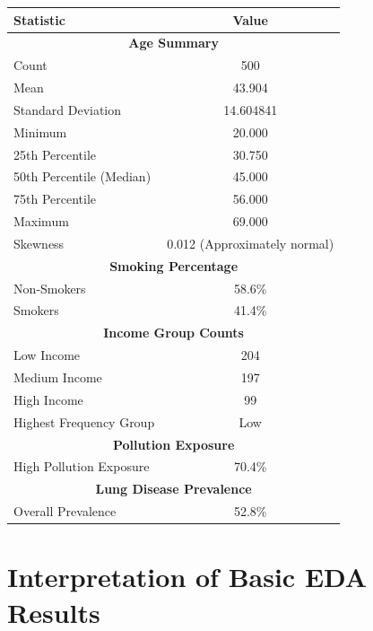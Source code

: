 \documentclass[12pt,a4paper]{report}
\begin{document}
\begin{center}
\renewcommand{\arraystretch}{1.2}
\setlength{\tabcolsep}{10pt}
\begin{tabular}{|l|c|}
\hline
\textbf{Statistic} & \textbf{Value} \\ \hline
\multicolumn{2}{|c|}{\textbf{Age Summary}} \\ \hline
Count & 500 \\ \hline
Mean & 43.904 \\ \hline
Standard Deviation & 14.604841 \\ \hline
Minimum & 20.000 \\ \hline
25th Percentile & 30.750 \\ \hline
50th Percentile (Median) & 45.000 \\ \hline
75th Percentile & 56.000 \\ \hline
Maximum & 69.000 \\ \hline
Skewness & 0.012 (Approximately normal) \\ \hline
\multicolumn{2}{|c|}{\textbf{Smoking Percentage}} \\ \hline
Non‑Smokers & 58.6\% \\ \hline
Smokers & 41.4\% \\ \hline
\multicolumn{2}{|c|}{\textbf{Income Group Counts}} \\ \hline
Low Income & 204 \\ \hline
Medium Income & 197 \\ \hline
High Income & 99 \\ \hline
Highest Frequency Group & Low \\ \hline
\multicolumn{2}{|c|}{\textbf{Pollution Exposure}} \\ \hline
High Pollution Exposure & 70.4\% \\ \hline
\multicolumn{2}{|c|}{\textbf{Lung Disease Prevalence}} \\ \hline
Overall Prevalence & 52.8\% \\ \hline
\end{tabular}
\end{center}
\section*{Interpretation of Basic EDA Results}
\end{document}
